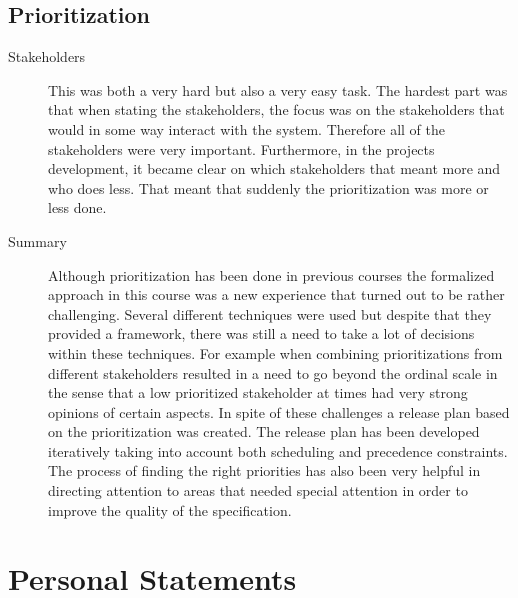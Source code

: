 \documentclass[10pt,a4paper]{article}
\begin{document}
\subsection{Prioritization}
\begin{description}
\item[Stakeholders] This was both a very hard but also a very easy task. The hardest part was that when stating the stakeholders, the focus was on the stakeholders that would in some way interact with the system. Therefore all of the stakeholders were very important. Furthermore, in the projects development, it became clear on which stakeholders that meant more and who does less. That meant that suddenly the prioritization was more or less done.

\item[Summary] Although prioritization has been done in previous courses the formalized approach in this course was  a new experience that turned out to be rather challenging. Several different techniques were used but despite that they provided a framework, there was still a need to take a lot of decisions within these techniques. For example when combining prioritizations from different stakeholders resulted in a need to go beyond the ordinal scale in the sense that a low prioritized stakeholder at times had very strong opinions of certain aspects. In spite of these challenges a release plan based on the prioritization was created. The release plan has been developed iteratively taking into account both scheduling and precedence constraints. The process of finding the right priorities has also been very helpful in directing attention to areas that needed special attention in order to improve the quality of the specification. 


\end{description}

\section{Personal Statements}
\end{document}
